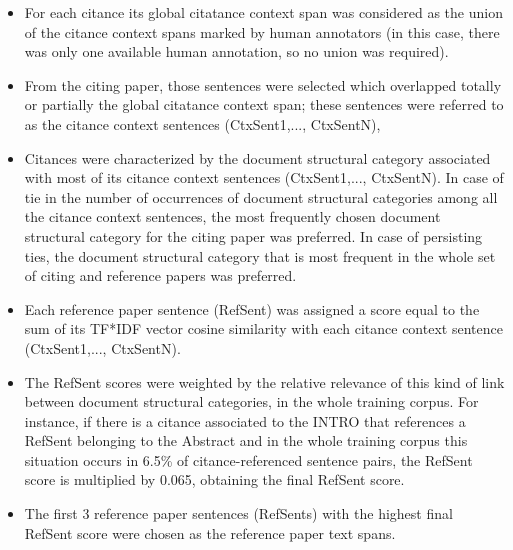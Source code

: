 \documentclass[11pt]{article}
\begin{document}
\begin{itemize}
\item{For each citance its global citatance context span was considered as the union 
of the citance context spans} marked by human annotators (in this case, there 
was only one available human annotation, so no union was required).
\item{From the citing paper, those sentences were selected} which overlapped totally 
or partially the global citatance context span; these sentences were referred 
to as the citance context sentences (CtxSent1,..., CtxSentN),
\item{Citances were characterized by the document structural category 
associated with most of its citance context sentences 
(CtxSent1,..., CtxSentN)}. In case of tie in the number of occurrences of 
document structural categories among all the citance context sentences, the most frequently chosen document structural category for the citing paper was preferred. In case of persisting ties, the document structural category that is most frequent in the whole set of citing and reference papers was preferred.
\item{Each reference paper sentence (RefSent) was assigned a score} equal 
to the sum of its TF*IDF vector cosine similarity with each citance context 
sentence (CtxSent1,..., CtxSentN).
\item{The RefSent scores were weighted by the relative relevance} of this kind of link between document structural 
categories,  in the whole training corpus. For instance, if there is a citance associated to the 
INTRO that references a RefSent belonging to the Abstract and in the whole training corpus this situation occurs in 6.5\% of citance-referenced sentence pairs, the RefSent score is multiplied by 0.065, obtaining the final 
RefSent score.
\item{The first 3 reference paper sentences} (RefSents) with the highest 
final RefSent score were chosen as the reference paper text spans.
\end{itemize}
\end{document}
